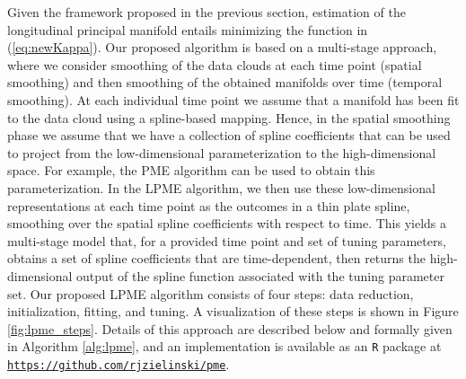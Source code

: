 \documentclass[11pt,reqno]{article}
\theoremstyle{definition}
\begin{document}
Given the framework proposed in the previous section, estimation of the longitudinal principal manifold entails minimizing the function in (\ref{eq:newKappa}). Our proposed algorithm is based on a multi-stage approach, where we consider smoothing of the data clouds at each time point (spatial smoothing) and then smoothing of the obtained manifolds over time (temporal smoothing). At each individual time point we assume that a manifold has been fit to the data cloud using a spline-based mapping. Hence, in the spatial smoothing phase we assume that we have a collection of spline coefficients that can be used to project from the low-dimensional parameterization to the high-dimensional space. For example, the PME algorithm can be used to obtain this parameterization. In the LPME algorithm, we then use these low-dimensional representations at each time point as the outcomes in a thin plate spline, smoothing over the spatial spline coefficients with respect to time. This yields a multi-stage model that, for a provided time point and set of tuning parameters, obtains a set of spline coefficients that are time-dependent, then returns the high-dimensional output of the spline function associated with the tuning parameter set. Our proposed LPME algorithm consists of four steps: data reduction, initialization, fitting, and tuning. A visualization of these steps is shown in Figure \ref{fig:lpme_steps}. Details of this approach are described below and formally given in Algorithm \ref{alg:lpme}, and an implementation is available as an \texttt{R} package at \href{https://github.com/rjzielinski/pme}{\texttt{https://github.com/rjzielinski/pme}}.
\end{document}

